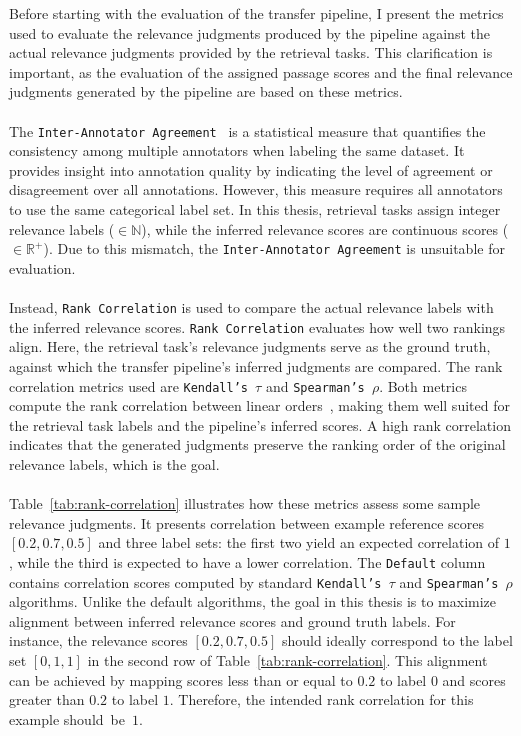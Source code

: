 Before starting with the evaluation of the transfer pipeline, I present the metrics used to evaluate the relevance judgments produced by the pipeline against the actual relevance judgments provided by the retrieval tasks. This clarification is important, as the evaluation of the assigned passage scores and the final relevance judgments generated by the pipeline are based on these metrics.
\\\\
The \texttt{Inter-Annotator Agreement}~\citep{artstein:2017} is a statistical measure that quantifies the consistency among multiple annotators when labeling the same dataset. It provides insight into annotation quality by indicating the level of agreement or disagreement over all annotations. However, this measure requires all annotators to use the same categorical label set. In this thesis, retrieval tasks assign integer relevance labels ($\in \mathbb{N}$), while the inferred relevance scores are continuous scores ($\in \mathbb{R}^{+}$). Due to this mismatch, the \mbox{\texttt{Inter-Annotator Agreement}} is unsuitable for evaluation.
\\\\
Instead, \texttt{Rank Correlation} is used to compare the actual relevance labels with the inferred relevance scores. \texttt{Rank Correlation} evaluates how well two rankings align. Here, the retrieval task's relevance judgments serve as the ground truth, against which the transfer pipeline's inferred judgments are compared. The rank correlation metrics used are \texttt{Kendall's $\tau$} and \texttt{Spearman's $\rho$}. Both metrics compute the rank correlation between linear orders~\citep{monjardet:1998}, making them well suited for the retrieval task labels and the pipeline's inferred scores. A high rank correlation indicates that the generated judgments preserve the ranking order of the original relevance labels, which is the goal.
\\\\
Table~\ref{tab:rank-correlation} illustrates how these metrics assess some sample relevance judgments. It presents correlation between example reference scores $[0.2, 0.7, 0.5]$ and three label sets: the first two yield an expected correlation of $1$, while the third is expected to have a lower correlation. The \texttt{Default} column contains correlation scores computed by standard \texttt{Kendall's $\tau$} and \texttt{Spearman's $\rho$} algorithms. Unlike the default algorithms, the goal in this thesis is to maximize alignment between inferred relevance scores and ground truth labels. For instance, the relevance scores $[0.2, 0.7, 0.5]$ should ideally correspond to the label set $[0, 1, 1]$ in the second row of Table~\ref{tab:rank-correlation}. This alignment can be achieved by mapping scores less than or equal to $0.2$ to label $0$ and scores greater than $0.2$ to label $1$. Therefore, the intended rank correlation for this example \mbox{should be $1$.}
